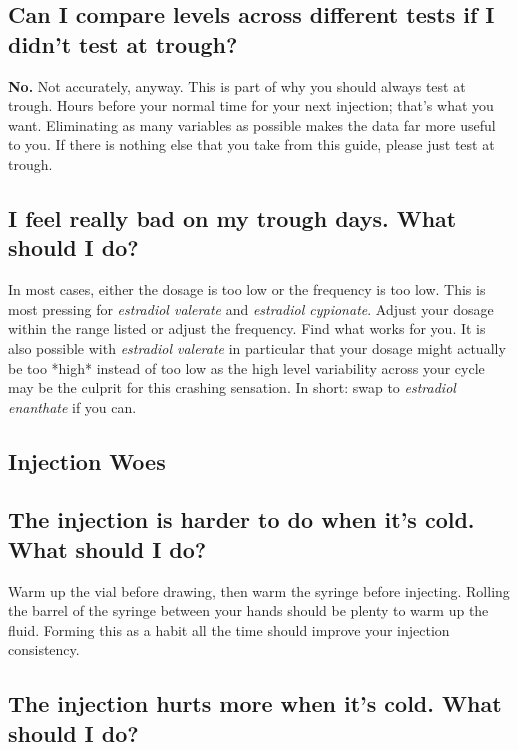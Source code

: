 \documentclass{article}
\begin{document}
\subsection{Can I compare levels across different tests if I didn’t test at trough?}

\textbf{No.} Not accurately, anyway. This is part of why you should always test at trough. Hours before your normal time for your next injection; that’s what you want. Eliminating as many variables as possible makes the data far more useful to you. If there is nothing else that you take from this guide, please just test at trough.

\subsection{I feel really bad on my trough days. What should I do?}\label{7-3}

In most cases, either the dosage is too low or the frequency is too low. This is most pressing for \textit{estradiol valerate} and \textit{estradiol cypionate}. Adjust your dosage within the range listed or adjust the frequency. Find what works for you. It is also possible with \textit{estradiol valerate} in particular that your dosage might actually be too *high* instead of too low as the high level variability across your cycle may be the culprit for this crashing sensation. In short: swap to \textit{estradiol enanthate} if you can.

\subsection*{Injection Woes}

\subsection{The injection is harder to do when it’s cold. What should I do?}

Warm up the vial before drawing, then warm the syringe before injecting. Rolling the barrel of the syringe between your hands should be plenty to warm up the fluid. Forming this as a habit all the time should improve your injection consistency.

\subsection{The injection hurts more when it’s cold. What should I do?}
\end{document}

